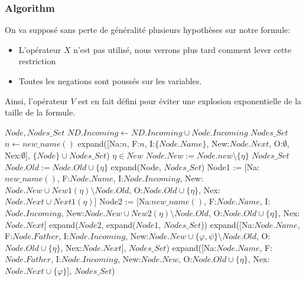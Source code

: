 \documentclass{paper}
\begin{document}
    \subsubsection{Algorithm}
    On va supposé sans perte de généralité plusieurs hypothèses sur notre formule:
    \begin{itemize}
        \item L'opérateur $X$ n'est pas utilisé, nous verrons plus tard comment lever cette restriction
        \item Toutes les negations sont poussés sur les variables.
    \end{itemize}
    Ainsi, l'opérateur $V$ est en fait défini pour éviter une explosion exponentielle de la taille de la formule.

    \begin{algorithm}
    \caption{Algorithme de Gerth - Expand}
    \begin{algorithmic}
        \Require $Node, Nodes\_Set$
                \State $ND.Incoming \gets ND.Incoming\cup Node.Incoming$
                \State \Return $Nodes\_Set$
            \EndIf
            \State $n \gets new\_name()$
            \State \Return expand([Na:$n$, F:$n$, I:$\{Node.Name\}$, New:$Node.Next$, O:$\emptyset$, Nex:$\emptyset$], $\{Node\}\cup Nodes\_Set$)
        \EndIf
        \State $\eta\in New$
        \State $Node.New := Node.new\setminus\{\eta\}$
                \State \Return $Nodes\_Set$
            \EndIf
            \State $Node.Old := Node.Old\cup\{\eta\}$
            \State \Return expand(Node, $Nodes\_Set$)
        \EndIf
            \State Node1 := [Na:$new\_name()$, F:$Node.Name$, I:$Node.Incoming$, New:$Node.New \cup New1(\eta) \setminus Node.Old$, O:$Node.Old \cup \{\eta\}$, Nex:$Node.Next\cup Next1(\eta)$]
            \State Node2 := [Na:$new\_name()$, F:$Node.Name$, I:$Node.Incoming$, New:$Node.New \cup New2(\eta) \setminus Node.Old$, O:$Node.Old \cup \{\eta\}$, Nex:$Node.Next$]
            \State \Return expand($Node2$, expand($Node1$, $Nodes\_Set$))
        \EndIf
        \If{$\eta = \varphi \land \psi$}
            \State \Return expand([Na:$Node.Name$, F:$Node.Father$, I:$Node.Incoming$, New:$Node.New \cup \{\varphi, \psi\}\setminus Node.Old$, O:$Node.Old \cup \{\eta\}$, Nex:$Node.Next$], $Nodes\_Set$)
        \EndIf
            \State \Return expand([Na:$Node.Name$, F:$Node.Father$, I:$Node.Incoming$, New:$Node.New$, O:$Node.Old \cup \{\eta\}$, Nex:$Node.Next\cup \{\varphi\}$], $Nodes\_Set$)
        \EndIf
    \end{algorithmic}
    \end{algorithm}
\end{document}
